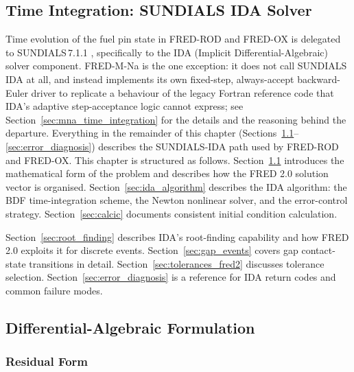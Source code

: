 \begin{refsection}

\section{Time Integration: SUNDIALS IDA Solver}
\label{sec:sundials}

Time evolution of the fuel pin state in FRED-ROD and FRED-OX is delegated to SUNDIALS\,7.1.1 \cite{hindmarsh2005}, specifically to the IDA (Implicit Differential-Algebraic) solver component. FRED-M-Na is the one exception: it does not call SUNDIALS IDA at all, and instead implements its own fixed-step, always-accept backward-Euler driver to replicate a behaviour of the legacy Fortran reference code that IDA's adaptive step-acceptance logic cannot express; see Section~\ref{sec:mna_time_integration} for the details and the reasoning behind the departure.  Everything in the remainder of this chapter (Sections~\ref{sec:dae_formulation}--\ref{sec:error_diagnosis}) describes the SUNDIALS-IDA path used by FRED-ROD and FRED-OX. This chapter is structured as follows.  Section~\ref{sec:dae_formulation} introduces the mathematical form of the problem and describes how the FRED 2.0 solution vector is organised.  Section~\ref{sec:ida_algorithm} describes the IDA algorithm: the BDF time-integration scheme, the Newton nonlinear solver, and the error-control strategy.  Section~\ref{sec:calcic} documents consistent initial condition calculation.

Section~\ref{sec:root_finding} describes IDA's root-finding capability and how FRED 2.0 exploits it for discrete events.  Section~\ref{sec:gap_events} covers gap contact-state transitions in detail.  Section~\ref{sec:tolerances_fred2} discusses tolerance selection.  Section~\ref{sec:error_diagnosis} is a reference for IDA return codes and common failure modes.


\subsection{Differential-Algebraic Formulation}
\label{sec:dae_formulation}

\subsubsection{Residual Form}


\end{refsection}

